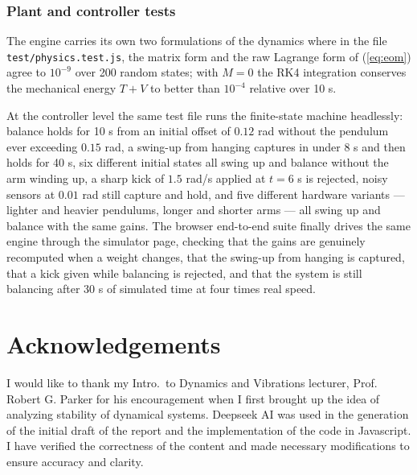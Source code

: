 \documentclass[12pt]{article}
\begin{document}
\subsubsection{Plant and controller tests}
\label{sec:plant-tests}

The engine carries its own two formulations of the dynamics where in the file \texttt{test/physics.test.js}, the matrix form and the raw Lagrange form of (\ref{eq:eom}) agree to $10^{-9}$ over 200 random states; with $M = 0$ the RK4 integration conserves the mechanical energy $T + V$ to better than $10^{-4}$ relative over 10 s.

At the controller level the same test file runs the finite-state machine headlessly: balance holds for 10 s from an initial offset of $0.12$ rad without the pendulum ever exceeding $0.15$ rad, a swing-up from hanging captures in under 8 s and then holds for 40 s, six different initial states all swing up and balance without the arm winding up, a sharp kick of $1.5$ rad/s applied at $t = 6$ s is rejected, noisy sensors at $0.01$ rad still capture and hold, and five different hardware variants --- lighter and heavier pendulums, longer and shorter arms --- all swing up and balance with the same gains. The browser end-to-end suite finally drives the same engine through the simulator page, checking that the gains are genuinely recomputed when a weight changes, that the swing-up from hanging is captured, that a kick given while balancing is rejected, and that the system is still balancing after 30 s of simulated time at four times real speed.


\newpage
\section*{Acknowledgements}
I would like to thank my Intro.~to Dynamics and Vibrations lecturer, Prof. Robert G. Parker for his encouragement when I first brought up the idea of analyzing stability of dynamical systems. Deepseek AI was used in the generation of the initial draft of the report and the implementation of the code in Javascript. I have verified the correctness of the content and made necessary modifications to ensure accuracy and clarity.

\newpage


\end{document}

